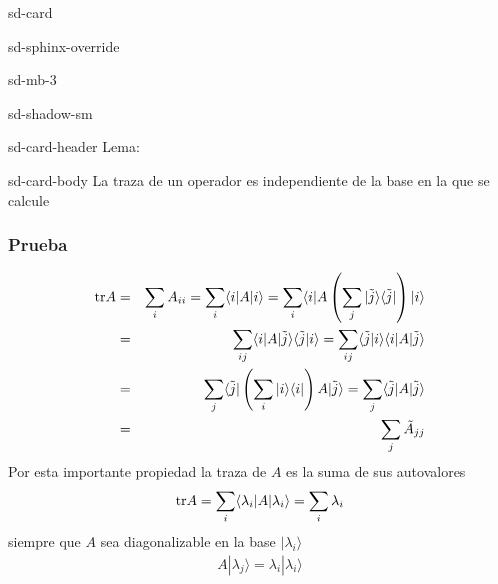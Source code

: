 \documentclass[letterpaper,10pt,english]{jupyterBook}
\newcommand{\bra}[1]{\langle #1|}
\newcommand{\ket}[1]{|#1\rangle}
\newcommand{\braket}[2]{\langle #1|#2\rangle}
\newcommand{\ketbra}[2]{| #1\rangle \langle #2 |}
\begin{document}
\begin{sphinxuseclass}{sd-card}
\begin{sphinxuseclass}{sd-sphinx-override}
\begin{sphinxuseclass}{sd-mb-3}
\begin{sphinxuseclass}{sd-shadow-sm}
\begin{sphinxuseclass}{sd-card-header}
\sphinxAtStartPar
Lema:

\end{sphinxuseclass}
\begin{sphinxuseclass}{sd-card-body}
\sphinxAtStartPar
La traza de un operador es independiente de la base en la que se calcule

\end{sphinxuseclass}
\end{sphinxuseclass}
\end{sphinxuseclass}
\end{sphinxuseclass}
\end{sphinxuseclass}\subsubsection*{Prueba}
\label{equation:docs/Part_01_Formalismo/Chapter_01_02_Formalismo_matemático/01_03_Operadores_myst:00f33b55-16f4-468c-b4ce-b72e0b15b563}\begin{eqnarray}
{\rm tr} A  &=&\sum_i A_{ii} =\sum_{i} \bra{i}A\ket{i} =\sum_{i} \bra{i}A\left( \sum_j\ketbra{\tilde j}{\tilde j}\right)\ket{i}
\nonumber\\
&=& \sum_{ij}\bra{i}A\ket{\tilde j} \braket{\tilde j}{i} = \sum_{ij}\braket{\tilde j}{i}\bra{i}A\ket{\tilde j}  \nonumber\\
&=& \sum_{j} \bra{\tilde j}\left(\sum_i\ketbra{i}{i}\right) A \ket{\tilde j}= \sum_{j} \bra{\tilde j}A\ket{\tilde j}\nonumber\\
&=& \sum_j \tilde A_{jj}
\end{eqnarray}
\sphinxAtStartPar
Por esta importante propiedad la traza de \(A\) es la suma de sus autovalores
\begin{equation*}
\begin{split}
{\rm tr} A = \sum_i \bra{\lambda_i}A\ket{\lambda_i} = \sum_i \lambda_i
\end{split}
\end{equation*}
\sphinxAtStartPar
siempre que \(A\) sea diagonalizable en la base \(\ket{\lambda_i}\)
\begin{equation*}
\begin{split}
A\ket{\lambda_j} = \lambda_i \ket{\lambda_i}
\end{split}
\end{equation*}
\end{document}
